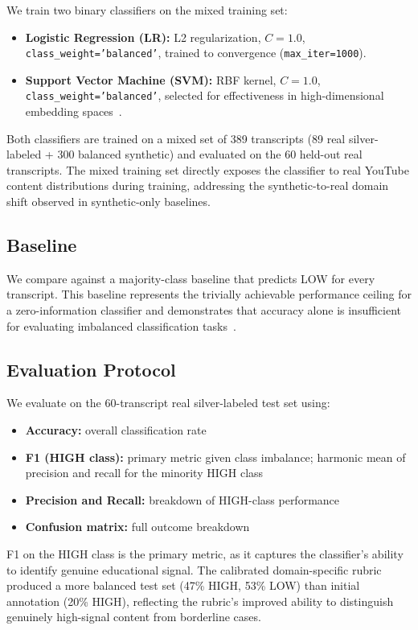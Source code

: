 \documentclass[11pt,a4paper]{article}
\begin{document}
We train two binary classifiers on the mixed training set:
\begin{itemize}
  \item \textbf{Logistic Regression (LR):} L2 regularization, $C{=}1.0$,
  \texttt{class\_weight='balanced'}, trained to convergence (\texttt{max\_iter=1000}).
  \item \textbf{Support Vector Machine (SVM):} RBF kernel, $C{=}1.0$,
  \texttt{class\_weight='balanced'}, selected for effectiveness in high-dimensional embedding
  spaces~\cite{cortes1995}.
\end{itemize}

Both classifiers are trained on a mixed set of 389 transcripts (89 real silver-labeled + 300
balanced synthetic) and evaluated on the 60 held-out real transcripts. The mixed training set
directly exposes the classifier to real YouTube content distributions during training, addressing
the synthetic-to-real domain shift observed in synthetic-only baselines.

\subsection{Baseline}

We compare against a majority-class baseline that predicts LOW for every transcript. This
baseline represents the trivially achievable performance ceiling for a zero-information
classifier and demonstrates that accuracy alone is insufficient for evaluating imbalanced
classification tasks~\cite{hegarcia2009}.

\subsection{Evaluation Protocol}

We evaluate on the 60-transcript real silver-labeled test set using:
\begin{itemize}
  \item \textbf{Accuracy:} overall classification rate
  \item \textbf{F1 (HIGH class):} primary metric given class imbalance; harmonic mean of
  precision and recall for the minority HIGH class
  \item \textbf{Precision and Recall:} breakdown of HIGH-class performance
  \item \textbf{Confusion matrix:} full outcome breakdown
\end{itemize}

F1 on the HIGH class is the primary metric, as it captures the classifier's ability to identify
genuine educational signal. The calibrated domain-specific rubric produced a more balanced test
set (47\% HIGH, 53\% LOW) than initial annotation (20\% HIGH), reflecting the rubric's improved
ability to distinguish genuinely high-signal content from borderline cases.
\end{document}
